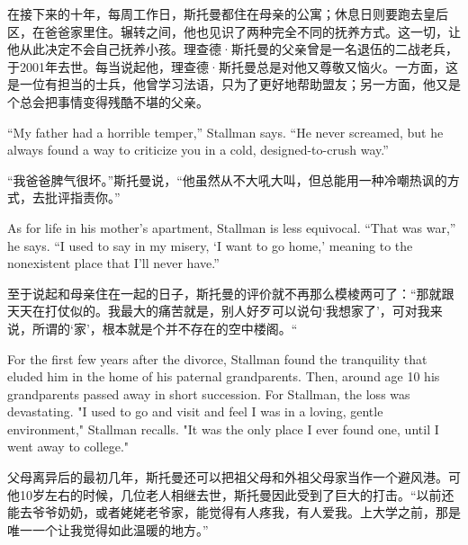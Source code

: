 \ifdefined\chs
在接下来的十年，每周工作日，斯托曼都住在母亲的公寓；休息日则要跑去皇后区，在爸爸家里住。辗转之间，他也见识了两种完全不同的抚养方式。这一切，让他从此决定不会自己抚养小孩。理查德·斯托曼的父亲曾是一名退伍的二战老兵，于2001年去世。每当说起他，理查德·斯托曼总是对他又尊敬又恼火。一方面，这是一位有担当的士兵，他曾学习法语，只为了更好地帮助盟友；另一方面，他又是个总会把事情变得残酷不堪的父亲。
\fi

\ifdefined\eng
``My father had a horrible temper,'' Stallman says. ``He never screamed, but he always found a way to criticize you in a cold, designed-to-crush way.''
\fi

\ifdefined\chs
``我爸爸脾气很坏。''斯托曼说，``他虽然从不大吼大叫，但总能用一种冷嘲热讽的方式，去批评指责你。''
\fi

\ifdefined\eng
As for life in his mother's apartment, Stallman is less equivocal. ``That was war,'' he says. ``I used to say in my misery, `I want to go home,' meaning to the nonexistent place that I'll never have.''
\fi

\ifdefined\chs
至于说起和母亲住在一起的日子，斯托曼的评价就不再那么模棱两可了：``那就跟天天在打仗似的。我最大的痛苦就是，别人好歹可以说句`我想家了'，可对我来说，所谓的`家'，根本就是个并不存在的空中楼阁。``
\fi

\ifdefined\eng
For the first few years after the divorce, Stallman found the tranquility that eluded him in the home of his paternal grandparents. Then, around age 10 his grandparents passed away in short succession. For Stallman, the loss was devastating. "I used to go and visit and feel I was in a loving, gentle environment," Stallman recalls. "It was the only place I ever found one, until I went away to college."
\fi

\ifdefined\chs
父母离异后的最初几年，斯托曼还可以把祖父母和外祖父母家当作一个避风港。可他10岁左右的时候，几位老人相继去世，斯托曼因此受到了巨大的打击。``以前还能去爷爷奶奶，或者姥姥老爷家，能觉得有人疼我，有人爱我。上大学之前，那是唯一一个让我觉得如此温暖的地方。''
\fi

